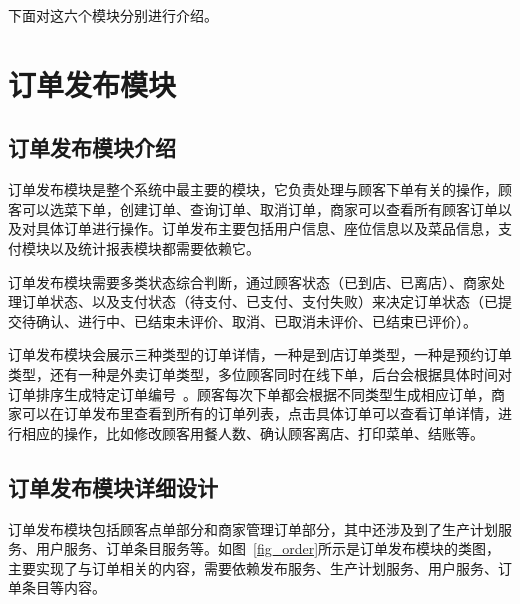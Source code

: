 下面对这六个模块分别进行介绍。\\

\section{订单发布模块}
\subsection{订单发布模块介绍}
订单发布模块是整个系统中最主要的模块，它负责处理与顾客下单有关的操作，顾客可以选菜下单，创建订单、查询订单、取消订单，商家可以查看所有顾客订单以及对具体订单进行操作。订单发布主要包括用户信息、座位信息以及菜品信息，支付模块以及统计报表模块都需要依赖它。

订单发布模块需要多类状态综合判断，通过顾客状态（已到店、已离店）、商家处理订单状态、以及支付状态（待支付、已支付、支付失败）来决定订单状态（已提交待确认、进行中、已结束未评价、取消、已取消未评价、已结束已评价）。

订单发布模块会展示三种类型的订单详情，一种是到店订单类型，一种是预约订单类型，还有一种是外卖订单类型，多位顾客同时在线下单，后台会根据具体时间对订单排序生成特定订单编号~\cite{hsp2017}。顾客每次下单都会根据不同类型生成相应订单，商家可以在订单发布里查看到所有的订单列表，点击具体订单可以查看订单详情，进行相应的操作，比如修改顾客用餐人数、确认顾客离店、打印菜单、结账等。\\

\subsection{订单发布模块详细设计}
订单发布模块包括顾客点单部分和商家管理订单部分，其中还涉及到了生产计划服务、用户服务、订单条目服务等。如图~\ref{fig_order}所示是订单发布模块的类图，主要实现了与订单相关的内容，需要依赖发布服务、生产计划服务、用户服务、订单条目等内容。

